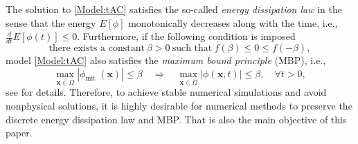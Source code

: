\documentclass{m2an}
\begin{document}
The solution to \eqref{Model:tAC} satisfies the so-called \textit{energy dissipation law} in the sense that the energy $ E[\phi] $ monotonically decreases along with the time, i.e., $ \frac{ d }{ dt } E[ \phi(t) ] \leq 0 $. Furthermore, if the following condition is imposed
\begin{equation}\label{Condi:MBP}
	\text{there exists a constant} \  \beta > 0 \  \text{such that} \  f(\beta) \leq 0 \leq f (-\beta),
\end{equation}
model \eqref{Model:tAC} also satisfies the \textit{maximum bound principle} (MBP),  i.e.,
\begin{equation}\label{MBP}
	\max_{\mathbf{x} \in \bar{\Omega}} |\phi_{\text {init }}(\mathbf{x})| \leq \beta \quad \Longrightarrow 
	\quad \max_{\mathbf{x} \in \bar{\Omega}}|\phi(\mathbf{x},t)| \leq \beta, \quad \forall t>0,
\end{equation}
see \cite{SIREV_Du_2021} for details.
Therefore, to achieve stable numerical simulations and avoid nonphysical solutions, it is highly desirable for numerical methods %
to preserve the discrete energy dissipation law and MBP. That is also the main objective of this paper.
\end{document}
